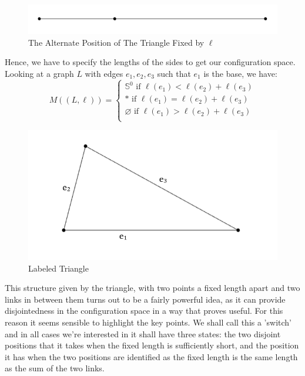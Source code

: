 \documentclass{article}
\begin{document}
\begin{figure}[h!]
\centering
\includegraphics[scale=0.5]{./images/triangle_alt_switch_fixed}
\caption{The Alternate Position of The Triangle Fixed by $\ell$}
\label{fig:The Alternate Position of The Triangle Fixed}
\end{figure}

\noindent Hence, we have to specify the lengths of the sides to get our configuration space. Looking at a graph $L$ with edges $e_1,e_2,e_3$ such that $e_1$ is the base, we have:
$$
M((L,\ell)) = 
\begin{cases}
\mathbb S^0 \text{ if } \ell(e_1) < \ell(e_2) + \ell(e_3) \\
\mathbb * \text{ if } \ell(e_1) = \ell(e_2) + \ell(e_3) \\
\mathbb \varnothing \text{ if } \ell(e_1) > \ell(e_2) + \ell(e_3) \\
\end{cases}
$$

\begin{figure}[h!]
\centering
\includegraphics[scale=0.5]{./images/triangle_labeled.png}
\caption{Labeled Triangle}
\label{fig:Triangle Labeled}
\end{figure}

\noindent This structure given by the triangle, with two points a fixed length apart and two links in between them turns out to be a fairly powerful idea, as it can provide disjointedness in the configuration space in a way that proves useful. For this reason it seems sensible to highlight the key points. We shall call this a 'switch' and in all cases we're interested in it shall have three states: the two disjoint positions that it takes when the fixed length is sufficiently short, and the position it has when the two positions are identified as the fixed length is the same length as the sum of the two links.
\end{document}
